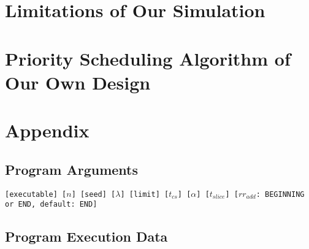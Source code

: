 \documentclass{article}
\begin{document}
\section{Limitations of Our Simulation}
\section{Priority Scheduling Algorithm of Our Own Design}
\section{Appendix}
\subsection*{Program Arguments}
{\tt[executable] [$n$] [seed] [$\lambda$] [limit] [$t_{cs}$] [$\alpha$] [$t_{slice}$] [$rr_{add}$: BEGINNING or END, default: END]}

\subsection*{Program Execution Data}
\end{document}
